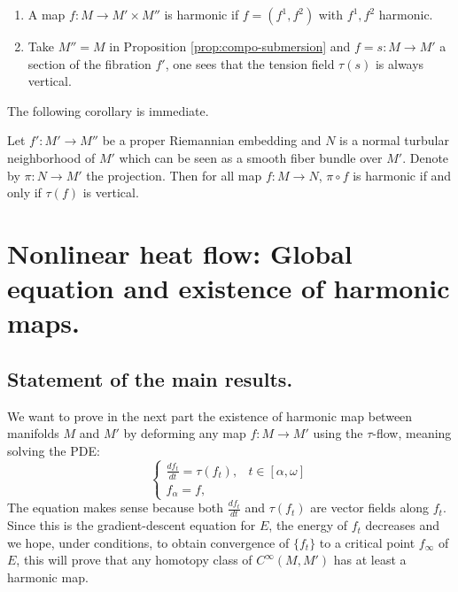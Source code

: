 \begin{exampl}
\begin{enumerate}
\item A map \(f: M \longrightarrow M'\times M''\) is harmonic if \(f=(f^1, f^2)\) with \(f^1, f^2\) harmonic.
\item Take \(M''=M\) in Proposition \ref{prop:compo-submersion} and \(f=s: M \longrightarrow M'\) a
section of the fibration \(f'\), one sees that the tension field \(\tau(s)\) is
always vertical.
\end{enumerate}
\end{exampl}

The following corollary is immediate.
\begin{corollary}
\label{cor:compo-with-submersion}
Let \(f': M' \longrightarrow M''\) be a proper Riemannian embedding and \(N\) is a
normal turbular neighborhood of \(M'\) which can be seen as a smooth fiber bundle over
\(M'\). Denote by \(\pi: N \longrightarrow M'\) the projection. Then for all map \(f:
M \longrightarrow N\), \(\pi\circ f\) is harmonic if and only if \(\tau(f)\) is vertical. 
\end{corollary}

\fi



\section{Nonlinear heat flow: Global equation and existence of harmonic maps.}
\label{sec:orgec9b5c0}
\subsection{Statement of the main results.}
\label{sec:org6fcf717}

We want to prove in the next part the existence of harmonic map between manifolds \(M\)
and \(M'\) by deforming any map \(f: M
\longrightarrow M'\) using the \(\tau\)-flow, meaning solving the PDE:
\begin{equation}
\label{eq:loc-heat-flow}
\begin{cases}
\frac{d f_t}{d t} = \tau (f_t),  & t\in [\alpha,\omega] \\
f_\alpha = f, & 
\end{cases}
\end{equation}
The equation makes sense because both \(\frac{d f_t}{d t}\) and \(\tau (f_t)\) are
vector fields along \(f_t\). Since this is the gradient-descent equation for \(E\),
the energy of \(f_t\) decreases and we hope, under conditions, to obtain
convergence of \(\{f_t\}\) to a critical point \(f_\infty\) of \(E\), this will prove
that any homotopy class of \(C^\infty(M,M')\) has at least a harmonic map.

